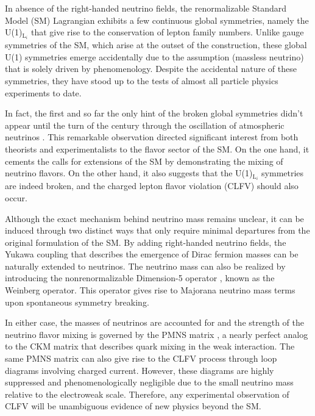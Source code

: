 In absence of the right-handed neutrino fields, the renormalizable Standard Model (SM) Lagrangian exhibits a few continuous global symmetries, namely the U(1)$_{\text{L}_{i}}$ that give rise to the conservation of lepton family numbers. Unlike gauge symmetries of the SM, which arise at the outset of the construction, these global U(1) symmetries emerge accidentally due to the assumption (massless neutrino) that is solely driven by phenomenology. Despite the accidental nature of these symmetries, they have stood up to the tests of almost all particle physics experiments to date.  

In fact, the first and so far the only hint of the broken global symmetries didn't appear until the turn of the century through the oscillation of atmospheric neutrinos \cite{Super-Kamiokande:1998kpq,SNO:2002tuh}. This remarkable observation directed significant interest from both theorists and experimentalists to the flavor sector of the SM. On the one hand, it cements the calls for extensions of the SM by demonstrating the mixing of neutrino flavors. On the other hand, it also suggests that the U(1)$_{\text{L}_{i}}$ symmetries are indeed broken, and the charged lepton flavor violation (CLFV) should also occur. 

Although the exact mechanism behind neutrino mass remains unclear, it can be induced through two distinct ways that only require minimal departures from the original formulation of the SM. By adding right-handed neutrino fields, the Yukawa coupling \cite{PhysRevLett.19.1264} that describes the emergence of Dirac fermion masses can be naturally extended to neutrinos. The neutrino mass can also be realized by introducing the nonrenormalizable Dimension-5 operator \cite{Weinberg:1979sa}, known as the Weinberg operator. This operator gives rise to Majorana neutrino mass terms upon spontaneous symmetry breaking. 

In either case, the masses of neutrinos are accounted for and the strength of the neutrino flavor mixing is governed by the PMNS matrix \cite{Pontecorvo:1957cp,Maki:1962mu}, a nearly perfect analog to the CKM matrix \cite{Cabibbo:1963yz,Kobayashi:1973fv} that describes quark mixing in the weak interaction. The same PMNS matrix can also give rise to the CLFV process through loop diagrams involving charged current. However, these diagrams are highly suppressed and phenomenologically negligible due to the small neutrino mass relative to the electroweak scale. Therefore, any experimental observation of CLFV will be unambiguous evidence of new physics beyond the SM.

